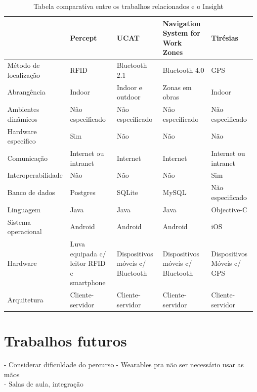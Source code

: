 \documentclass[english,brazilian]{UNISINOSmonografia}
\begin{document}
\FloatBarrier
\begin{table}
	\caption{Tabela comparativa entre os trabalhos relacionados e o Insight}
	\label{tab:trabalalhosRelacionadosEInsight}
	\centering%
	\begin{minipage}{1\textwidth}
		\begin{tabular}{ | p{3cm} | p{3cm} | p{3cm} | p{3cm} | p{3cm} | }
			\hline
										& Percept 									& UCAT 								& Navigation System for Work Zones		& Tirésias   \\ \hline
				Método de localização 	& RFID 										& Bluetooth 2.1 					& Bluetooth 4.0 						& GPS 						 \\ \hline
				Abrangência 			& Indoor 									& Indoor e outdoor 					& Zonas em obras 						& Indoor 					 \\ \hline
				Ambientes dinâmicos		& Não especificado							& Não especificado					& Não especificado						& Não especificado			 \\ \hline
				Hardware específico 	& Sim 										& Não 								& Não 									& Não 						 \\ \hline
				Comunicação 			& Internet ou intranet 						& Internet 							& Internet 								& Internet ou intranet 		 \\ \hline
				Interoperabilidade 		& Não 										& Não 								& Não 									& Sim 						 \\ \hline
				Banco de dados 			& Postgres 									& SQLite 							& MySQL 								& Não especificado 			 \\ \hline
				Linguagem 				& Java 										& Java 								& Java 									& Objective-C 				 \\ \hline
				Sistema operacional 	& Android 									& Android 							& Android 								& iOS 						 \\ \hline
				Hardware 				& Luva equipada c/ leitor RFID e smartphone & Dispositivos móveis c/ Bluetooth 	& Dispositivos móveis c/ Bluetooth 		& Dispositivos Móveis c/ GPS \\ \hline
				Arquitetura 			& Cliente-servidor 							& Cliente-servidor 					& Cliente-servidor 						& Cliente-servidor 			 \\ \hline
		\end{tabular}
	\end{minipage}
\end{table}
\FloatBarrier
	
	\section{Trabalhos futuros}
- Considerar dificuldade do percurso
- Wearables pra não ser necessário usar as mãos \\
- Salas de aula, integração 


\end{document}
